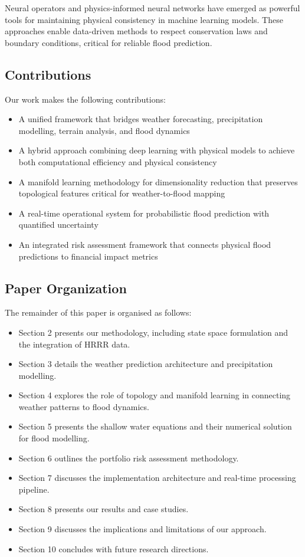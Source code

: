 \documentclass{article}
\begin{document}
Neural operators \cite{li2020} and physics-informed neural networks \cite{raissi2019} have emerged as powerful tools for maintaining physical consistency in machine learning models. These approaches enable data-driven methods to respect conservation laws and boundary conditions, critical for reliable flood prediction.

\subsection{Contributions}
Our work makes the following contributions:

\begin{itemize}
    \item A unified framework that bridges weather forecasting, precipitation modelling, terrain analysis, and flood dynamics
    \item A hybrid approach combining deep learning with physical models to achieve both computational efficiency and physical consistency
    \item A manifold learning methodology for dimensionality reduction that preserves topological features critical for weather-to-flood mapping
    \item A real-time operational system for probabilistic flood prediction with quantified uncertainty
    \item An integrated risk assessment framework that connects physical flood predictions to financial impact metrics
\end{itemize}

\subsection{Paper Organization}
The remainder of this paper is organised as follows: 
\begin{itemize}
    \item Section 2 presents our methodology, including state space formulation and the integration of HRRR data. 
    \item Section 3 details the weather prediction architecture and precipitation modelling.
    \item Section 4 explores the role of topology and manifold learning in connecting weather patterns to flood dynamics. 
    \item Section 5 presents the shallow water equations and their numerical solution for flood modelling. 
    \item Section 6 outlines the portfolio risk assessment methodology. 
    \item Section 7 discusses the implementation architecture and real-time processing pipeline.
    \item Section 8 presents our results and case studies. 
    \item Section 9 discusses the implications and limitations of our approach.
    \item Section 10 concludes with future research directions.
\end{itemize}
\end{document}

